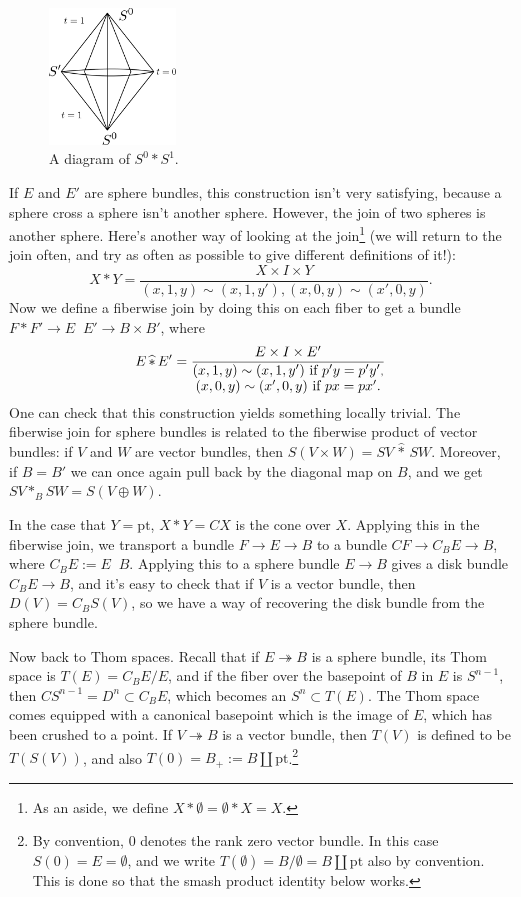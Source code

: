 \documentclass{article}
\newcommand{\pt}[1]{#1_+}
\newcommand{\ptspace}{\mathrm{pt}}
\newcommand{\onto}{\twoheadrightarrow}
\begin{document}
\begin{figure} %
\centering\includegraphics[width=0.3\textwidth]{figures/fig9.pdf}
\caption{\small A diagram of $S^0 \ast S^1$.}
\end{figure}
If $E$ and $E'$ are sphere bundles, this construction isn't very satisfying, because a sphere cross a sphere isn't another sphere.  However, the join of two spheres is another sphere.  Here's another way of looking at the join\footnote{As an aside, we define $X \ast \emptyset = \emptyset \ast X = X$.} (we will return to the join often, and try as often as possible to give different definitions of it!):
\[
X \ast Y = \frac{X \times I \times Y}{(x, 1, y) \sim (x, 1, y'), (x, 0, y) \sim (x', 0, y)}.
\]
Now we define a fiberwise join by doing this on each fiber to get a bundle $F \ast F' \to E\mathop{\widehat\ast}E' \to B \times B'$, where \[E\mathop{\widehat\ast}E' = \frac{E \times I \times E'}{\substack{\hbox{$(x, 1, y) \sim (x, 1, y')$ if $p'y = p'y'$}, \\ \hbox{$(x, 0, y) \sim (x', 0, y)$ if $px = px'$.}}}\]  One can check that this construction yields something locally trivial.  The fiberwise join for sphere bundles is related to the fiberwise product of vector bundles: if $V$ and $W$ are vector bundles, then $S(V \times W) = SV \,\widehat \ast \,SW$.  Moreover, if $B = B'$ we can once again pull back by the diagonal map on $B$, and we get $SV \ast_B SW = S(V \oplus W)$.

In the case that $Y = \ptspace$, $X \ast Y = CX$ is the cone over $X$.  Applying this in the fiberwise join, we transport a bundle $F \to E \to B$ to a bundle $CF \to C_B E \to B$, where $C_BE:=E\mathop{\widehat\ast}B$.  Applying this to a sphere bundle $E \to B$ gives a disk bundle $C_B E \to B$, and it's easy to check that if $V$ is a vector bundle, then $D(V) = C_B S(V)$, so we have a way of recovering the disk bundle from the sphere bundle.

Now back to Thom spaces.  Recall that if $E \onto B$ is a sphere bundle, its Thom space is $T(E) = C_B E / E$, and if the fiber over the basepoint of $B$ in $E$ is $S^{n-1}$, then $CS^{n-1} = D^n \subset C_B E$, which becomes an $S^n \subset T(E)$.  The Thom space comes equipped with a canonical basepoint which is the image of $E$, which has been crushed to a point.  If $V \onto B$ is a vector bundle, then $T(V)$ is defined to be $T(S(V))$, and also $T(0) = \pt{B}:=B \amalg \ptspace$.\footnote{By convention, $0$ denotes the rank zero vector bundle.  In this case $S(0) = E = \emptyset$, and we write $T(\emptyset) = B / \emptyset = B \amalg \ptspace$ also by convention.  This is done so that the smash product identity below works.}
\end{document}
